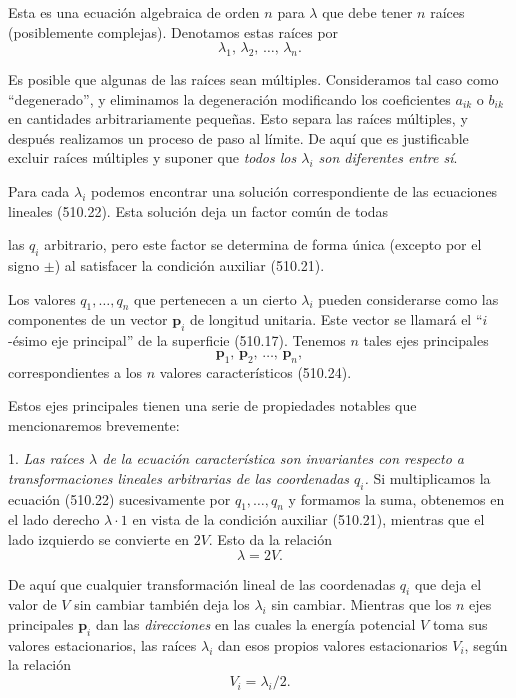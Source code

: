 \documentclass[12pt,a4paper]{book}
\newcommand{\vect}[1]{\mathbf{#1}}
\begin{document}
Esta es una ecuación algebraica de orden $n$ para $\lambda$ que debe tener $n$ raíces (posiblemente complejas). Denotamos estas raíces por
\begin{equation}
\lambda_1, \, \lambda_2, \, \ldots, \, \lambda_n. \tag{510.24}
\end{equation}

Es posible que algunas de las raíces sean múltiples. Consideramos tal caso como ``degenerado'', y eliminamos la degeneración modificando los coeficientes $a_{ik}$ o $b_{ik}$ en cantidades arbitrariamente pequeñas. Esto separa las raíces múltiples, y después realizamos un proceso de paso al límite. De aquí que es justificable excluir raíces múltiples y suponer que \textit{todos los $\lambda_i$ son diferentes entre sí}.

Para cada $\lambda_i$ podemos encontrar una solución correspondiente de las ecuaciones lineales (510.22). Esta solución deja un factor común de todas


las $q_i$ arbitrario, pero este factor se determina de forma única (excepto por el signo $\pm$) al satisfacer la condición auxiliar (510.21).

Los valores $q_1, \ldots, q_n$ que pertenecen a un cierto $\lambda_i$ pueden considerarse como las componentes de un vector $\vect{p}_i$ de longitud unitaria. Este vector se llamará el ``$i$-ésimo eje principal'' de la superficie (510.17). Tenemos $n$ tales ejes principales
\begin{equation}
\vect{p}_1, \, \vect{p}_2, \, \ldots, \, \vect{p}_n, \tag{510.25}
\end{equation}
correspondientes a los $n$ valores característicos (510.24).

Estos ejes principales tienen una serie de propiedades notables que mencionaremos brevemente:

1. \textit{Las raíces $\lambda$ de la ecuación característica son invariantes con respecto a transformaciones lineales arbitrarias de las coordenadas $q_i$.} Si multiplicamos la ecuación (510.22) sucesivamente por $q_1, \ldots, q_n$ y formamos la suma, obtenemos en el lado derecho $\lambda \cdot 1$ en vista de la condición auxiliar (510.21), mientras que el lado izquierdo se convierte en $2V$. Esto da la relación
\begin{equation}
\lambda = 2V. \tag{510.26}
\end{equation}

De aquí que cualquier transformación lineal de las coordenadas $q_i$ que deja el valor de $V$ sin cambiar también deja los $\lambda_i$ sin cambiar. Mientras que los $n$ ejes principales $\vect{p}_i$ dan las \textit{direcciones} en las cuales la energía potencial $V$ toma sus valores estacionarios, las raíces $\lambda_i$ dan esos propios valores estacionarios $V_i$, según la relación
\begin{equation}
V_i = \lambda_i / 2. \tag{510.27}
\end{equation}
\end{document}
